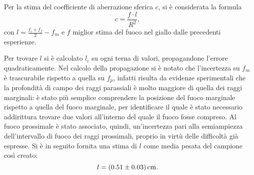 
Per la stima del coefficiente di aberrazione sferica $c$, si \`e considerata la formula
\[ c=\frac{f \cdot l}{R^2}, \] 
con \( l = \frac{f_i + f_f}{2} - f_m \) e $f$ miglior stima del fuoco nel giallo dalle precedenti esperienze.

Per trovare $l$ si \`e calcolato $l_i$ su ogni terna di valori, propagandone l'errore quadraticamente. Nel calcolo della propagazione si \`e notato che l'incertezza su $f_m$ è trascurabile rispetto a quella su $f_p$, infatti risulta da evidenze sperimentali che la profondità di campo dei raggi parassiali \`e molto maggiore di quella dei raggi marginali: è stato più semplice comprendere la posizione del fuoco marginale rispetto a quella del fuoco marginale, per identificare il quale è stato necessario addirittura trovare due valori all'interno del quale il fuoco fosse compreso. Al fuoco prossimale è stato associato, quindi, un'incertezza pari alla semiampiezza dell'intervallo di fuoco dei raggi prossimali, proprio in virt\`u delle difficolt\`a già espresse. Si \`e in seguito fornita una stima di $l$ come media pesata del campione cos\`i creato: %
\[ l = (0.51 \pm 0.03) \,\mathrm{cm}. \]

